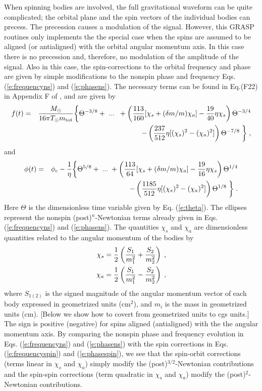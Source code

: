 When spinning bodies are involved, the full gravitational
waveform can be quite complicated; the orbital plane 
and the spin vectors of the individual bodies can
precess.  The precession causes a modulation of the signal.
However, this GRASP routines only implements the the special case 
when the spins are assumed to be aligned (or antialigned) with the
orbital angular momentum axis.
In this case there is no precession and, therefore, no modulation
of the amplitude of the signal.
Also in this case,
the spin-corrections to the orbital frequency and phase 
are given by simple modifications to the nonspin phase and frequency
Eqs. (\ref{e:frequencyns}) and (\ref{e:phasens}).
The necessary terms can be found in Eq.(F22) in Appendix F of \cite{willwiseman},
and are given by
\begin{eqnarray}
\label{e:frequencyspin}
f(t)&=& {M_\odot \over 16 \pi  T_\odot m_{\rm tot}} 
\biggl\{ \Theta^{-3/8} + \; {\rm ...} \;\
+\left({113\over160} [\chi_s + (\delta m /m) \chi_a] -{19\over40}\eta \chi_s \right)
\Theta^{-3/4} \nonumber \\
&&\qquad\qquad\qquad
-\left( {237\over 512} \eta [(\chi_s)^2 -(\chi_a)^2] \right) \Theta^{-7/8}
 \;\biggr\} \;,
\end{eqnarray}
and
\begin{eqnarray}
\label{e:phasespin}
\phi (t) &=&\phi_c -{1\over\eta} \biggl\{ \Theta^{5/8} + \; {\rm ...} \; 
+\left({113\over64} [\chi_s + (\delta m /m) \chi_a] -{19\over16}\eta \chi_s \right)
\Theta^{1/4} \nonumber \\
&&\qquad\qquad\quad
-\left( {1185\over 512} \eta [(\chi_s)^2 -(\chi_a)^2] \right) \Theta^{1/8}
 \; \biggr\}\;.
\end{eqnarray}
Here $\Theta$ is the dimensionless time variable given by Eq. (\ref{e:theta}).
The ellipses represent the nonspin (post)$^n$-Newtonian terms already given
in Eqs. (\ref{e:frequencyns}) and (\ref{e:phasens}).
The quantities $\chi_s$ and $\chi_a$ are dimensionless
quantities related to the
angular momentum of the bodies by
\begin{eqnarray}
\label{e:chi_defn}
\chi_s={1\over 2}\left({ S_1 \over m_1^2}+{ S_2 \over m_2^2} \right) \; , \\
\chi_a={1\over 2}\left({ S_1 \over m_1^2}-{ S_2 \over m_2^2} \right) \; ,
\end{eqnarray}
where $S_{1(2)}$ is the signed magnitude of the angular momentum vector of each body
expressed in geometrized units (cm$^2$), and $m_i$ is the
mass in geometrized units (cm).
[Below we show how to covert from geometrized units to cgs units.]
The sign is positive (negative) for spins aligned (antialigned) with the 
the angular momentum axis.
By comparing the nonspin phase and frequency  evolution 
in Eqs. (\ref{e:frequencyns}) and (\ref{e:phasens})
with the spin corrections in Eqs. (\ref{e:frequencyspin}) and (\ref{e:phasespin}),
we see that the spin-orbit corrections (terms linear 
in $\chi_s$ and $\chi_a$) simply modify the (post)$^{3/2}$-Newtonian
contributions
and the spin-spin corrections (term quadratic in $\chi_s$ and $\chi_a$)  
modify the (post)$^{2}$-Newtonian contributions.

